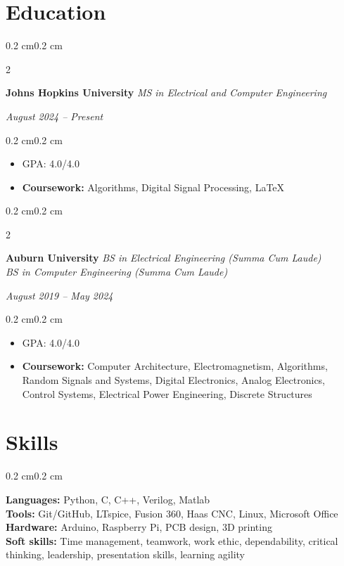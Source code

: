 \documentclass[10pt, letterpaper]{article}
\newenvironment{highlights}{
    \begin{itemize}[topsep=0.10 cm,parsep=0.10 cm,partopsep=0pt,itemsep=0pt,leftmargin=0.4 cm + 10pt]
}{
    \end{itemize}
}
\newenvironment{onecolentry}{
    \begin{adjustwidth}{0.2 cm}{0.2 cm}
}{
    \end{adjustwidth}
}
\newenvironment{twocolentry}[2][]{
    \onecolentry
    \def\secondColumn{#2}
    \setcolumnwidth{\fill, 4.5 cm}
    \begin{paracol}{2}
}{
    \switchcolumn \raggedleft \secondColumn
    \end{paracol}
    \endonecolentry
}
\let\hrefWithoutArrow\href
\renewcommand{\href}[2]{\hrefWithoutArrow{#1}{#2 \raisebox{.15ex}{\footnotesize \faExternalLink*}}}
\begin{document}
        
    \section{Education}
        \begin{twocolentry}{
        \textit{August 2024 – Present}}
            \textbf{Johns Hopkins University}
            \newline
            \textit{MS in Electrical and Computer Engineering}
        \end{twocolentry}
        \vspace{0.10 cm}
        \begin{onecolentry}
            \begin{highlights}
                \item GPA: 4.0/4.0 %
                \item \textbf{Coursework:} Algorithms, Digital Signal Processing, \LaTeX
            \end{highlights}
        \end{onecolentry}
        \vspace{0.2 cm}
        \begin{twocolentry}{
        \textit{August 2019 – May 2024}}
            \textbf{Auburn University}
            \newline
            \textit{BS in Electrical Engineering (Summa Cum Laude)} \\
            \textit{BS in Computer Engineering (Summa Cum Laude)}
        \end{twocolentry}

        \vspace{0.10 cm}
        \begin{onecolentry}
            \begin{highlights}
                \item GPA: 4.0/4.0 %
                \item \textbf{Coursework:} Computer Architecture, Electromagnetism, Algorithms, Random Signals and Systems, Digital Electronics, Analog Electronics, Control Systems, Electrical Power Engineering, Discrete Structures
            \end{highlights}
        \end{onecolentry}


    \section{Skills}
        \begin{onecolentry}
            \textbf{Languages:} Python, C, C++, Verilog, Matlab \\
            \textbf{Tools:} Git/GitHub, LTspice, Fusion 360, Haas CNC, Linux, Microsoft Office \\
            \textbf{Hardware:} Arduino, Raspberry Pi, PCB design, 3D printing \\
            \textbf{Soft skills:} Time management, teamwork, work ethic, dependability, critical thinking, leadership, presentation skills, learning agility
        \end{onecolentry}
\end{document}
